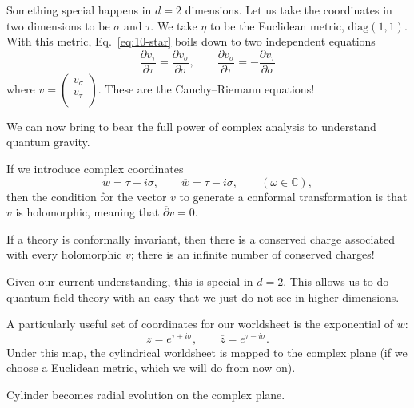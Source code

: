 Something special happens in $d = 2$ dimensions.
Let us take the coordinates in two dimensions to be $\sigma$ and $\tau$. We take $\eta$ to be the Euclidean metric, $\text{diag}(1, 1)$.
With this metric, Eq.~\eqref{eq:10-star} boils down to two independent equations
\begin{equation}
  \boxed{\frac{\partial v_\tau}{\partial \tau} = \frac{\partial v_{\sigma}}{\partial \sigma}, \qquad \frac{\partial v_{\sigma}}{\partial \tau} = - \frac{\partial v_{\tau}}{\partial \sigma}}
\end{equation}
where $v = 
\begin{pmatrix}
v_{\sigma} \\
v_{\tau} \\
\end{pmatrix}$.
These are the Cauchy--Riemann equations!
\begin{remark}
  We can now bring to bear the full power of complex analysis to understand quantum gravity.
\end{remark}
If we introduce complex coordinates
\begin{equation}
  w = \tau + i \sigma, \qquad \overline{w}{} = \tau -i \sigma, \qquad (\omega \in \mathbb{C}),
\end{equation}
then the condition for the vector $v$ to generate a conformal transformation is that $v$ is holomorphic, meaning that $\overline{\partial}{}v = 0$.

If a theory is conformally invariant, then there is a conserved charge associated with every holomorphic $v$; there is an infinite number of conserved charges!
\begin{remark}
  Given our current understanding, this is special in $d = 2$.
  This allows us to do quantum field theory with an easy that we just do not see in higher dimensions.
\end{remark}

A particularly useful set of coordinates for our worldsheet is the exponential of $w$:
\begin{equation}
  \label{eq:z}
  z = e^{\tau + i \sigma}, \qquad \overline{z}{} = e^{\tau - i \sigma}.
\end{equation}
Under this map, the cylindrical worldsheet is mapped to the complex plane (if we choose a Euclidean metric, which we will do from now on).

\begin{figure}[tbhp]
  \centering
  \begin{minipage}[t]{0.5\columnwidth}
    \centering
    \def\svgwidth{0.9\columnwidth}
    
    \caption{}
    \label{fig:l10f1}
  \end{minipage}%
  \begin{minipage}[t]{0.5\columnwidth}
    \centering
    \def\svgwidth{0.6\columnwidth}
    
    \caption{}
    \label{fig:l10f2}
  \end{minipage}
\end{figure}

Cylinder becomes radial evolution on the complex plane.
